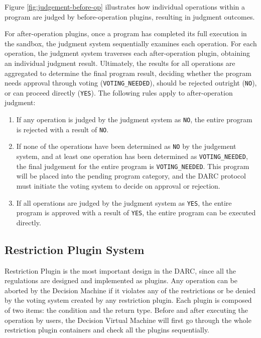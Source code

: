 \documentclass[main.tex]{subfiles}
\begin{document}
Figure \ref{fig:judgement-before-op} illustrates how individual operations within a program are judged by before-operation plugins, resulting in judgment outcomes.








For after-operation plugins, once a program has completed its full execution in the sandbox, the judgment system sequentially examines each operation. For each operation, the judgment system traverses each after-operation plugin, obtaining an individual judgment result. Ultimately, the results for all operations are aggregated to determine the final program result, deciding whether the program needs approval through voting (\texttt{VOTING\_NEEDED}), should be rejected outright (\texttt{NO}), or can proceed directly (\texttt{YES}). The following rules apply to after-operation judgment:

\begin{enumerate}
    \item If any operation is judged by the judgment system as \texttt{NO}, the entire program is rejected with a result of \texttt{NO}.
    \item If none of the operations have been determined as \texttt{NO} by the judgement system, and at least one operation has been determined as \texttt{VOTING\_NEEDED}, the final judgement for the entire program is \texttt{VOTING\_NEEDED}. This program will be placed into the pending program category, and the DARC protocol must initiate the voting system to decide on approval or rejection.
    \item If all operations are judged by the judgment system as \texttt{YES}, the entire program is approved with a result of \texttt{YES}, the entire program can be executed directly.
\end{enumerate}



\subsection{Restriction Plugin System}

Restriction Plugin is the most important design in the DARC, since all the regulations are designed and implemented as plugins. Any operation can be aborted by the Decision Machine if it violates any of the restrictions or be denied by the voting system created by any restriction plugin. Each plugin is composed of two items: the condition and the return type. Before and after executing the operation by users, the Decision Virtual Machine will first go through the whole restriction plugin containers and check all the plugins sequentially. 
\end{document}
